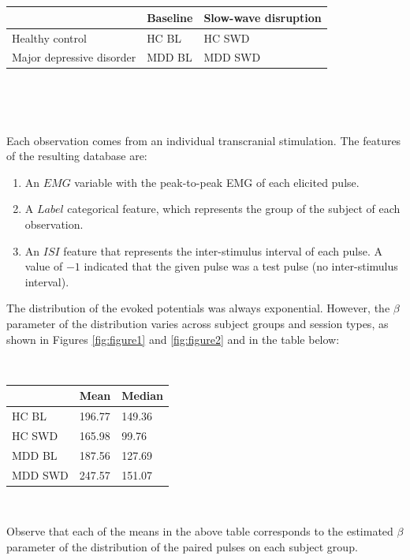 \documentclass{article}
\begin{document}
\begin{multicols}{2}
~

~

\begin{tabular}{ |p{2cm}|p{2cm}|p{2cm}|  }
\hline
& Baseline & Slow-wave disruption \\
\hline
Healthy control & HC BL & HC SWD \\
\hline
Major depressive disorder & MDD BL & MDD SWD \\
\hline
\end{tabular}

~

~

Each observation comes from an individual transcranial stimulation. The features
of the resulting database are:

\begin{enumerate}
    \item An $EMG$ variable with the peak-to-peak EMG of each elicited pulse.
    \item A $Label$ categorical feature, which represents the group of
        the subject of each observation. 
    \item An $ISI$ feature that represents the inter-stimulus interval of each
        pulse. A value of $-1$ indicated that the given pulse was a test pulse (no
        inter-stimulus interval).
\end{enumerate}

The distribution of the evoked potentials was always exponential. However, the
$\beta$ parameter of the distribution varies across subject groups and session
types, as shown in Figures \ref{fig:figure1} and \ref{fig:figure2} and in the
table below:

~

    \begin{tabular}{ |p{2cm}|p{2cm}|p{2cm}|  }
    \hline
    &       Mean & Median \\
    \hline
    HC BL & 196.77 & 149.36 \\
    \hline
    HC SWD & 165.98 & 99.76 \\
    \hline 
    MDD BL & 187.56 & 127.69\\ 
    \hline 
    MDD SWD & 247.57 & 151.07 \\
    \hline
    \end{tabular}

~ 

Observe that each of the means in the above table corresponds to the estimated
$\beta$ parameter of the distribution of the paired pulses on each subject
group.


\end{multicols}
\end{document}
